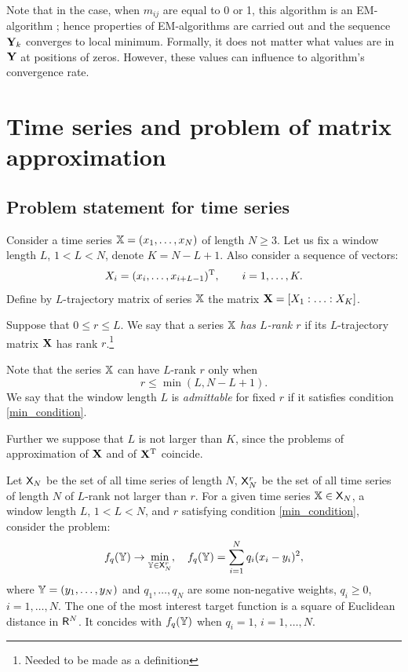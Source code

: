\documentclass[sii]{ipart}
\begin{document}
Note that in the case, when $m_{ij}$ are equal to 0 or 1, this algorithm is an EM-algorithm \cite{Srebro2003};
hence properties of EM-algorithms are carried out and the sequence $\mathbf{Y}_k$ converges to local minimum. Formally, it does not matter what values are in $\mathbf{Y}$ at positions of zeros. However, these values can influence to algorithm's convergence rate.

\section{Time series and problem of matrix approximation}
\label{sec:ts_matrices}
\subsection{Problem statement for time series}
Consider a time series $\mathbb{X} = (x_1, \ldots, x_N)$ of length $N \ge 3$. Let us fix a window length $L$, $1 < L < N$, denote $K = N - L + 1$. Also consider a sequence of vectors:
\begin{equation}\label{l_lagged}
X_i = (x_i, \ldots, x_{i + L - 1})^\rmT, \qquad i = 1, \ldots, K.
\end{equation}
Define by $L$-trajectory matrix of series $\mathbb{X}$ the matrix $\mathbf{X} = [X_1:\ldots:X_K]$.

Suppose that $0 \le r \le L$. We say that a series $\mathbb{X}$ \emph{has $L$-rank $r$} if its $L$-trajectory matrix $\mathbf{X}$ has rank $r$.\footnote{Needed to be made as a definition}

Note that the series $\mathbb{X}$ can have $L$-rank $r$ only when
\begin{equation}
r \le \min(L, N-L+1). \label{min_condition}
\end{equation}
We say that the window length $L$ is \emph{admittable} for fixed $r$ if it satisfies condition \eqref{min_condition}.

Further we suppose that $L$ is not larger than $K$, since the problems of approximation of $\mathbf{X}$ and of $\mathbf{X}^{\mathrm{T}}$ coincide.

Let $\mathsf{X}_N$ be the set of all time series of length $N$, $\mathsf{X}_N^r$ be the set of all time series of length $N$ of $L$-rank not larger than $r$. For a given time series $\mathbb{X} \in \mathsf{X}_N$, a window length $L$, $1 < L < N$, and $r$ satisfying condition \eqref{min_condition}, consider the problem:
\begin{equation} \label{L-rank_task}
f_q(\tsY) \to \min_{\tsY \in \sfX_N^r}, \quad f_q(\tsY) = \sum \limits_{i=1}^N q_i(x_i - y_i)^2,
\end{equation}
where $\mathbb{Y} = (y_1, \ldots, y_N)$ and $q_1, \ldots, q_N$ are some non-negative weights,
$q_i \ge 0$, $i = 1, \ldots, N$. The one of the most interest target function is a square of Euclidean distance in $\mathsf{R}^N$. It concides with $f_q(\mathbb{Y})$ when $q_i = 1$, $i = 1, \ldots, N$.
\end{document}
